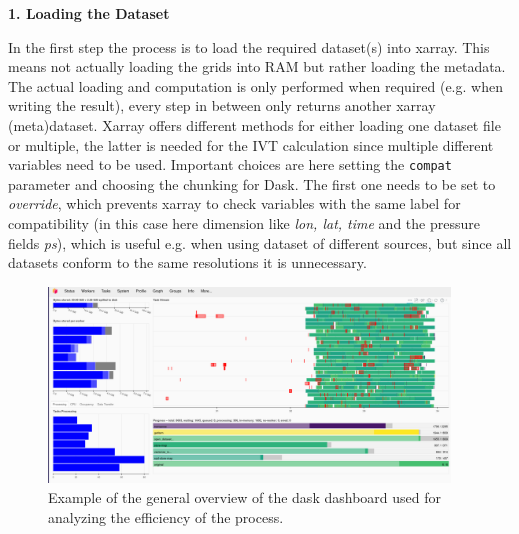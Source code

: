 \textbf{1. Loading the Dataset}

In the first step the process is to load the required dataset(s) into xarray. 
This means not actually loading the grids into RAM but rather loading the metadata. 
The actual loading and computation is only performed when required (e.g. when writing the result), every step in between only returns another xarray (meta)dataset. 
Xarray offers different methods for either loading one dataset file or multiple, the latter is needed for the IVT calculation since multiple different variables need to be used. 
Important choices are here setting the \texttt{compat} parameter and choosing the chunking for Dask. 
The first one needs to be set to \textit{override}, which prevents xarray to check variables with the same label for compatibility (in this case here dimension like \textit{lon, lat, time} and the pressure fields \textit{ps}), which is useful e.g. when using dataset of different sources, but since all datasets conform to the same resolutions it is unnecessary. 

\begin{figure}[htb]
  \begin{center}
    \includegraphics[width=0.95\textwidth]{figures/dask_dashboard_example.png}
  \end{center}
  \caption{Example of the general overview of the dask dashboard used for analyzing the efficiency of the process.}
  \label{fig:dask-dashboard}
\end{figure}


